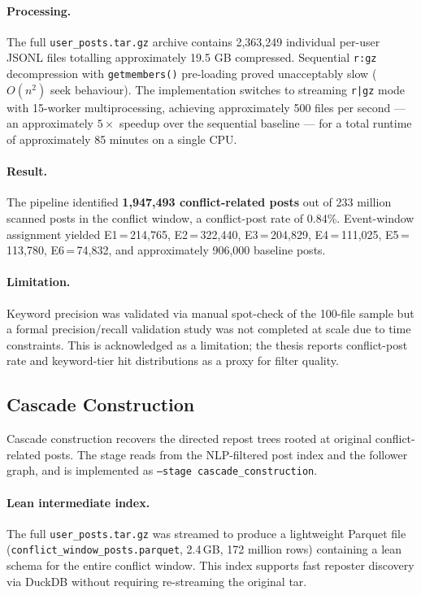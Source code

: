 \documentclass[12pt, a4paper]{article}
\begin{document}
\paragraph{Processing.} The full \texttt{user\_posts.tar.gz} archive contains 2,363,249 individual per-user JSONL files totalling approximately 19.5 GB compressed. Sequential \texttt{r:gz} decompression with \texttt{getmembers()} pre-loading proved unacceptably slow ($O(n^2)$ seek behaviour). The implementation switches to streaming \texttt{r|gz} mode with 15-worker multiprocessing, achieving approximately 500 files per second --- an approximately $5\times$ speedup over the sequential baseline --- for a total runtime of approximately 85 minutes on a single CPU.

\paragraph{Result.} The pipeline identified \textbf{1,947,493 conflict-related posts} out of 233 million scanned posts in the conflict window, a conflict-post rate of 0.84\%. Event-window assignment yielded E1\,=\,214,765, E2\,=\,322,440, E3\,=\,204,829, E4\,=\,111,025, E5\,=\,113,780, E6\,=\,74,832, and approximately 906,000 baseline posts.

\paragraph{Limitation.} Keyword precision was validated via manual spot-check of the 100-file sample but a formal precision/recall validation study was not completed at scale due to time constraints. This is acknowledged as a limitation; the thesis reports conflict-post rate and keyword-tier hit distributions as a proxy for filter quality.

\subsection{Cascade Construction}
\label{sec:cascade}

Cascade construction recovers the directed repost trees rooted at original conflict-related posts. The stage reads from the NLP-filtered post index and the follower graph, and is implemented as \texttt{--stage cascade\_construction}.

\paragraph{Lean intermediate index.} The full \texttt{user\_posts.tar.gz} was streamed to produce a lightweight Parquet file (\texttt{conflict\_window\_posts.parquet}, 2.4\,GB, 172 million rows) containing a lean schema for the entire conflict window. This index supports fast reposter discovery via DuckDB without requiring re-streaming the original tar.
\end{document}
